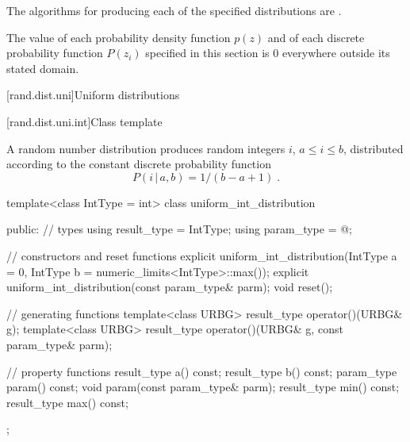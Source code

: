 \pnum
The algorithms for producing each
of the specified distributions are
.

\pnum
The value of each probability density function $p(z)$
and of each discrete probability function $P(z_i)$
specified in this section
is $0$
everywhere outside its stated domain.


[rand.dist.uni]{Uniform distributions}%
%


[rand.dist.uni.int]{Class template }%
%
%

\pnum
A  random number distribution
produces random integers $i$,
$ a \leq i \leq b $,
distributed according to
the constant discrete probability function%
%
%
\[%
 P(i\,|\,a,b) = 1 / (b - a + 1)
\; \mbox{.}
\]

%
\begin{codeblock}
template<class IntType = int>
  class uniform_int_distribution {
  public:
    // types
    using result_type = IntType;
    using param_type  = @\unspec@;

    // constructors and reset functions
    explicit uniform_int_distribution(IntType a = 0, IntType b = numeric_limits<IntType>::max());
    explicit uniform_int_distribution(const param_type& parm);
    void reset();

    // generating functions
    template<class URBG>
      result_type operator()(URBG& g);
    template<class URBG>
      result_type operator()(URBG& g, const param_type& parm);

    // property functions
    result_type a() const;
    result_type b() const;
    param_type param() const;
    void param(const param_type& parm);
    result_type min() const;
    result_type max() const;
  };
\end{codeblock}


